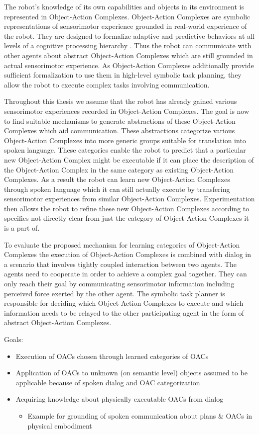 \documentclass[english,ngerman]{KITreprt}
\begin{document}
The robot's knowledge of its own capabilities and objects in its environment is
represented in Object-Action Complexes. Object-Action Complexes are symbolic
representations of sensorimotor experience grounded in real-world experience of
the robot. They are designed to formalize adaptive and predictive behaviors at
all levels of a cognitive processing hierarchy \cite{Geib2011}. Thus the robot can
communicate with other agents about abstract Object-Action Complexes which are
still grounded in actual sensorimotor experience. As Object-Action Complexes
additionally provide sufficient formalization to use them in high-level symbolic
task planning, they allow the robot to execute complex tasks involving
communication.

Throughout this thesis we assume that the robot has already gained various
sensorimotor experiences recorded in Object-Action Complexes. The goal is now to
find suitable mechanisms to generate abstractions of these Object-Action
Complexes which aid communication. These abstractions categorize various
Object-Action Complexes into more generic groups suitable for translation into
spoken language. These categories enable the robot to predict that a particular
new Object-Action Complex might be executable if it can place the description
of the Object-Action Complex in the same category as existing Object-Action
Complexes. As a result the robot can learn new Object-Action Complexes through
spoken language which it can still actually execute by transfering sensorimotor
experiences from similar Object-Action Complexes. Experimentation then allows
the robot to refine these new Object-Action Complexes according to specifics
not directly clear from just the category of Object-Action Complexes it is a
part of.

To evaluate the proposed mechanism for learning categories of Object-Action
Complexes the execution of Object-Action Complexes is combined with
dialog in a scenario that involves tightly coupled interaction between two
agents. The agents need to cooperate in order to achieve a complex goal
together. They can only reach their goal by communicating sensorimotor
information including perceived force exerted by the other agent. The symbolic
task planner is responsible for deciding which Object-Action Complexes to
execute and which information needs to be relayed to the other participating
agent in the form of abstract Object-Action Complexes.

Goals:
\begin{itemize}
    \item Execution of OACs chosen through learned categories of OACs
    \item Application of OACs to unknown (on semantic level) objects assumed to be
        applicable because of spoken dialog and OAC categorization
    \item Acquiring knowledge about physically executable OACs from dialog
        \begin{itemize}
            \item Example for grounding of spoken communication about plans \& OACs
                in physical embodiment
        \end{itemize}
\end{itemize}
\end{document}
